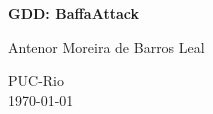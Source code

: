 \begin{titlepage}
    \centering
    \vspace*{1cm}

    \Huge
    \textbf{GDD: BaffaAttack}

    \vspace{2cm}

    \LARGE
    Antenor Moreira de Barros Leal

    \vfill

    \Large
    PUC-Rio\\
    \today

\end{titlepage}
